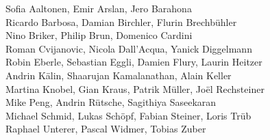 %
%
%
Sofia Aaltonen,		%
Emir Arslan, 		%
Jero Barahona%
\\
Ricardo Barbosa,	%
Damian Birchler,	%
Flurin Brechbühler%
\\
Nino Briker,		%
Philip Brun,		%
Domenico Cardini%
\\
Roman Cvijanovic,	%
Nicola Dall'Acqua,	%
Yanick Diggelmann%
\\
Robin Eberle,		%
Sebastian Eggli,	%
Damien Flury,		%
Laurin Heitzer%
\\
Andrin Kälin,		%
Shaarujan Kamalanathan,	%
Alain Keller%
\\
Martina Knobel,		%
Gian Kraus,		%
Patrik Müller,		%
Joël Rechsteiner%
\\
Mike Peng,		%
Andrin Rütsche,		%
Sagithiya Saseekaran%
\\
Michael Schmid,		%
Lukas Schöpf,		%
Fabian Steiner,		%
Loris Trüb%
\\
Raphael Unterer,	%
Pascal Widmer,		%
Tobias Zuber%
\\
